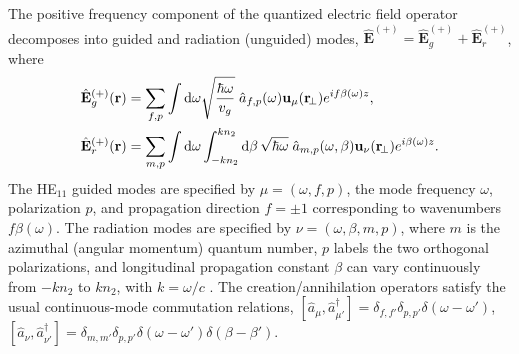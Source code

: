 \documentclass[preprint, aps,pra,onecolumn]{revtex4-1} %
\newcommand{\awg}{\hat{a}_{f,p}(\omega)}
\newcommand{\awr}{\hat{a}_{m,p}(\omega,\beta)}
\begin{document}
The positive frequency component of the quantized electric field operator decomposes into guided and radiation (unguided) modes, $\hat{\mathbf{E}}^{(+)}=\hat{\mathbf{E}}_g^{(+)}+\hat{\mathbf{E}}_{r}^{(+)}$, where
	\begin{align}
		\hat{\mathbf{E}}_g^{(+)}(\br) &= \sum_{f,p} \int \mathrm{d}\omega  \sqrt{\frac{ \hbar \omega}{ v_g}} \; \awg \mathbf{u}_\mu (\br\!_\perp) e^{i f\beta(\omega) z } ,\label{Eq::QuantizedElectricField} \\
		\hat{\mathbf{E}}_r^{(+)}(\br) &= \sum_{m,p} \int \mathrm{d}\omega   \int_{-kn_2}^{kn_2}\mathrm{d}\beta \, \sqrt{ \hbar \omega}\;\awr \mathbf{u}_\nu (\br\!_\perp) e^{i\beta(\omega) z }.
	\end{align}
The HE$_{11}$ guided modes are specified by $\mu =(\omega, f, p)$, the mode frequency $\omega$,  polarization $p$, and propagation direction $f=\pm1$ corresponding to wavenumbers $f\beta (\omega)$.  
The radiation modes are specified by  $\nu=(\omega, \beta, m, p)$, where $m$ is the azimuthal (angular momentum) quantum number, $p$ labels the two orthogonal polarizations, and longitudinal propagation constant $\beta$ can vary continuously from $-kn_2$ to $kn_2$, with $k = \omega/c$ \cite{sondergaard_general_2001,le_kien_spontaneous_2005}.  
The creation/annihilation operators satisfy the usual continuous-mode commutation relations, $[\hat{a}_\mu, \hat{a}^\dag_{\mu'} ] = \delta_{f,f'} \delta_{p,p'} \delta ( \omega - \omega ') $, $[\hat{a}_\nu ,\hat{a}^\dag_{\nu'} ] = \delta_{m,m'} \delta_{p,p'} \delta ( \omega - \omega ')  \delta ( \beta - \beta') $.
\end{document}
